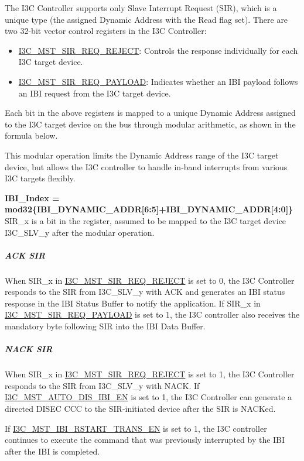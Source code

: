 \documentclass[main\_\_EN.tex]{subfiles}
\begin{document}
The I3C Controller supports only Slave Interrupt Request (SIR), which is a unique type (the assigned Dynamic Address with the Read flag set). There are two 32-bit vector control registers in the I3C Controller:

\begin{itemize}
    \item \hyperref[regdesc:I3CMSTIBISIRREQREJECTREG]{I3C\_MST\_SIR\_REQ\_REJECT}: Controls the response individually for each I3C target device.
    \item \hyperref[regdesc:I3CMSTIBISIRREQPAYLOADREG]{I3C\_MST\_SIR\_REQ\_PAYLOAD}: Indicates whether an IBI payload follows an IBI request from the I3C target device.
\end{itemize}

Each bit in the above registers is mapped to a unique Dynamic Address assigned to the I3C target device on the bus through modular arithmetic, as shown in the formula below.

This modular operation limits the Dynamic Address range of the I3C target device, but allows the I3C controller to handle in-band interrupts from various I3C targets flexibly.

\textbf{IBI\_Index = mod32\{IBI\_DYNAMIC\_ADDR[6:5]+IBI\_DYNAMIC\_ADDR[4:0]\}}\\

SIR\_x is a bit in the register, assumed to be mapped to the I3C target device I3C\_SLV\_y after the modular operation.

\subparagraph{ACK SIR}
When SIR\_x in \hyperref[regdesc:I3CMSTIBISIRREQREJECTREG]{I3C\_MST\_SIR\_REQ\_REJECT} is set to 0, the I3C Controller responds to the SIR from I3C\_SLV\_y with ACK and generates an IBI status response in the IBI Status Buffer to notify the application. If SIR\_x in \hyperref[regdesc:I3CMSTIBISIRREQPAYLOADREG]{I3C\_MST\_SIR\_REQ\_PAYLOAD} is set to 1, the I3C controller also receives the mandatory byte following SIR into the IBI Data Buffer.

\subparagraph{NACK SIR}
When SIR\_x in \hyperref[regdesc:I3CMSTIBISIRREQREJECTREG]{I3C\_MST\_SIR\_REQ\_REJECT} is set to 1, the I3C Controller responds to the SIR from I3C\_SLV\_y with NACK. If \hyperref[fielddesc:I3CMSTREGAUTODISIBIEN]{I3C\_MST\_AUTO\_DIS\_IBI\_EN} is set to 1, the I3C Controller can generate a directed DISEC CCC to the SIR-initiated device after the SIR is NACKed.

If \hyperref[fielddesc:I3CMSTREGIBIRSTARTTRANSEN]{I3C\_MST\_IBI\_RSTART\_TRANS\_EN} is set to 1, the I3C controller continues to execute the command that was previously interrupted by the IBI after the IBI is completed.
\end{document}
